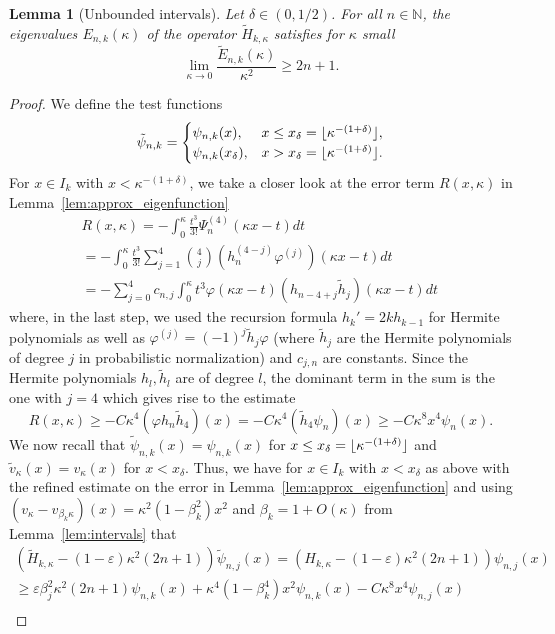 \documentclass[12pt, reqno]{amsart}
\newtheorem{lemma}[theorem]{Lemma}
\theoremstyle{definition}
\numberwithin{equation}{section}
\newcommand{\N}{{\mathbb N}}
\DeclarePairedDelimiter\floor{\lfloor}{\rfloor}
\begin{document}
\begin{lemma}[Unbounded intervals]\label{lem:lower_bound_modified} Let $\delta\in(0,1/2)$.
    For all  $n\in \N$,  the eigenvalues $E_{n,  k}(\kappa)$ of the operator $\tilde H_{k,\kappa}$ satisfies for  $\kappa$ small 
    $$\lim_{\kappa\to 0}\frac{\tilde E_{n,k}(\kappa)}{\kappa^2} \geq   2n+1.$$
\end{lemma}
\begin{proof}
We define the test functions %
$$\tilde \psi_{n,k}=
\begin{cases} \psi_{n,k}(x), & x\leq x_\delta=\floor{\kappa^{-(1+\delta)}},\\
\psi_{n,k}(x_\delta), & x> x_\delta=\floor{\kappa^{-(1+\delta)}} .\end{cases}$$
For $x\in I_k$ with $x<\kappa^{-(1+\delta)}$, we take a closer look at the error term $R(x,\kappa)$ in Lemma~\ref{lem:approx_eigenfunction} 
\begin{multline*}
  R(x,\kappa)=  -\int_0^\kappa \frac{t^3}{3!}\Psi_{n}^{(4)}(\kappa x-t) dt\\ =-\int_0^\kappa \frac{t^3}{3!}\sum_{j=1}^4\binom{4}{j}(h_n^{(4-j)}\varphi^{(j)})  (\kappa x-t) dt \\
    =-\sum_{j=0}^4c_{n,j}\int_0^\kappa t^3\varphi   (\kappa x-t) (h_{n-4+j}\tilde h_j)  (\kappa x-t) dt  \, 
\end{multline*}
where, in the last step, we used the recursion formula $h_k'=2kh_{k-1}$ for Hermite polynomials as well as $\varphi^{(j)}=(-1)^j \tilde h_j \varphi$ (where $\tilde h_j$ are the Hermite polynomials of degree $j$ in probabilistic normalization) 
and $c_{j,n}$ are constants. Since the Hermite polynomials $h_l,\tilde h_l$ are of degree $l$, the dominant term in the sum is the one with $j=4$ which gives rise to the estimate 
$$
 R(x,\kappa)\ge -C \kappa ^4(\varphi h_n \tilde h_4) (x)=-C\kappa ^4(\tilde h_4\psi_n)(x)\ge -C \kappa^8 x^4 \psi_n (x).$$   
We now recall that $\tilde\psi_{n,k}(x)=\psi_{n,k}(x)$ for $x\le x_\delta=\floor{\kappa^{-(1+\delta)}}$ and $\tilde v_\kappa(x)=v_\kappa(x)$ for $x< x_\delta$.  Thus,
we have for $x\in I_k$ with $x<x_\delta$
 as above  with the refined estimate on the error in Lemma~\ref{lem:approx_eigenfunction} and using $(v_\kappa-v_{\beta_k\kappa})(x)=\kappa^2(1-\beta_k^2)x^2$  and  
 $\beta_k=1+O(\kappa)$ from Lemma~\ref{lem:intervals} that
 \begin{multline*}
 ( \tilde H_{k,\kappa} -(1-\varepsilon)\kappa^2(2n+1) )\tilde\psi_{n,j}(x) =(  H_{k,\kappa} -(1-\varepsilon)\kappa^2(2n+1) ) \psi_{n,j}(x)\\\ge \varepsilon\beta_j^2 \kappa^2 (2n+1)  \psi_{n,k}(x)+ {\kappa}^4(1-\beta_k^4)x^2 \psi_{n,k}(x) - C \kappa^8 x^4 \psi_{n,j}(x)\\

\end{multline*}
\end{proof}
\end{document}
